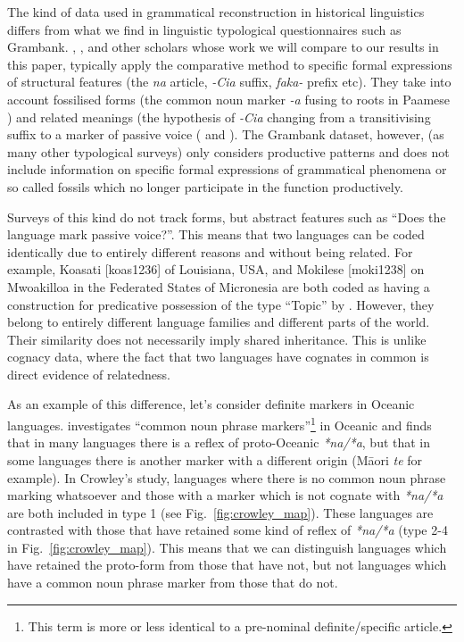 \documentclass[a4paper,10pt]{article} %
\begin{document}
The kind of data used in grammatical reconstruction in historical linguistics differs from what we find in linguistic typological questionnaires such as Grambank. \citet{crowley1985common}, \citet{clark1976aspects}, and other scholars whose work we will compare to our results in this paper, typically apply the comparative method to specific formal expressions of structural features (the \emph{na} article, \emph{-Cia} suffix, \emph{faka-} prefix etc). They take into account fossilised forms (the common noun marker \emph{-a} fusing to roots in Paamese \citep[141]{crowley1985common}) and related meanings (the hypothesis of \emph{-Cia} changing from a transitivising suffix to a marker of passive voice (\citet{hale_1968, hohepa_1967, hohepa_1969, chung1978} and \citet{jonsson1998}). The Grambank dataset, however, (as many other typological surveys) only considers productive patterns and does not include information on specific formal expressions of grammatical phenomena or so called fossils which no longer participate in the function productively.

Surveys of this kind do not track forms, but abstract features such as ``Does the language mark passive voice?''. This means that two languages can be coded identically due to entirely different reasons and without being related. For example, Koasati [koas1236] of Louisiana, USA, and Mokilese [moki1238] on Mwoakilloa in the Federated States of Micronesia are both coded as having a construction for predicative possession of the type ``Topic'' by \citet{wals-2011-117}. However, they belong to entirely different language families and different parts of the world. Their similarity does not necessarily imply shared inheritance. This is unlike cognacy data, where the fact that two languages have cognates in common is direct evidence of relatedness.

As an example of this difference, let's consider definite markers in Oceanic languages.\citet{crowley1985common} investigates ``common noun phrase markers''\footnote{This term is more or less identical to a pre-nominal definite/specific article.} in Oceanic and finds that in many languages there is a reflex of proto-Oceanic \emph{*na/*a}, but that in some languages there is another marker with a different origin (M\={a}ori \emph{te} for example). In Crowley's study, languages where there is no common noun phrase marking whatsoever and those with a marker which is not cognate with \emph{*na/*a} are both included in type 1 (see Fig.~\ref{fig:crowley_map}). These languages are contrasted with those that have retained some kind of reflex of \emph{*na/*a} (type 2-4 in Fig.~\ref{fig:crowley_map}). This means that we can distinguish languages which have retained the proto-form from those that have not, but not languages which have a common noun phrase marker from those that do not.
\end{document}
